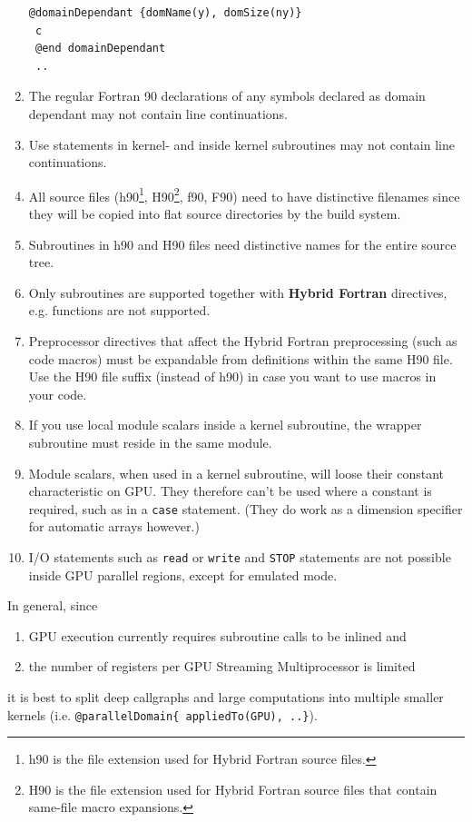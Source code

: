 \begin{enumerate}
\begin{lstlisting}[name=exampleMixedNotOK, label=listing:exampleMixedNotOK, caption={This is not ok.}]
 @domainDependant {domName(y), domSize(ny)}
 c
 @end domainDependant
 ..
 \end{lstlisting}
 \item The regular Fortran 90 declarations of any symbols declared as domain dependant may not contain line continuations.
 \item Use statements in kernel- and inside kernel subroutines may not contain line continuations.
 \item All source files (h90\footnote{h90 is the file extension used for Hybrid Fortran source files.}, H90\footnote{H90 is the file extension used for Hybrid Fortran source files that contain same-file macro expansions.}, f90, F90) need to have distinctive filenames since they will be copied into flat source directories by the build system.
 \item Subroutines in h90 and H90 files need distinctive names for the entire source tree.
 \item Only subroutines are supported together with \textbf{Hybrid Fortran} directives, e.g. functions are not supported.
 \item Preprocessor directives that affect the Hybrid Fortran preprocessing (such as code macros) must be expandable from definitions within the same H90 file. Use the H90 file suffix (instead of h90) in case you want to use macros in your code.
 \item If you use local module scalars inside a kernel subroutine, the wrapper subroutine must reside in the same module.
 \item Module scalars, when used in a kernel subroutine, will loose their constant characteristic on GPU. They therefore can't be used where a constant is required, such as in a \verb|case| statement. (They do work as a dimension specifier for automatic arrays however.)
 \item I/O statements such as \verb|read| or \verb|write| and \verb|STOP| statements are not possible inside GPU parallel regions, except for emulated mode.
\end{enumerate}

In general, since
\begin{enumerate}
  \item GPU execution currently requires subroutine calls to be inlined and
  \item the number of registers per GPU Streaming Multiprocessor is limited
\end{enumerate}
it is best to split deep callgraphs and large computations into multiple smaller kernels (i.e. \verb|@parallelDomain{ appliedTo(GPU), ..}|).


